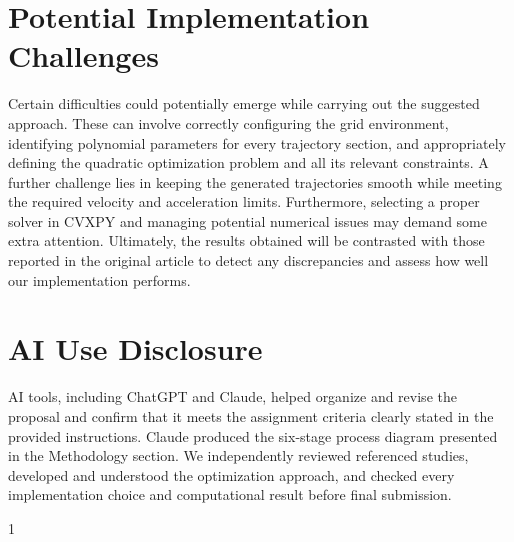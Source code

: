 \documentclass[12pt]{article}
\begin{document}
\section{Potential Implementation Challenges}
Certain difficulties could potentially emerge while carrying out the suggested approach. These can involve correctly configuring the grid environment, identifying polynomial parameters for every trajectory section, and appropriately defining the quadratic optimization problem and all its relevant constraints. A further challenge lies in keeping the generated trajectories smooth while meeting the required velocity and acceleration limits. Furthermore, selecting a proper solver in CVXPY and managing potential numerical issues may demand some extra attention. Ultimately, the results obtained will be contrasted with those reported in the original article to detect any discrepancies and assess how well our implementation performs.

\section{AI Use Disclosure}
AI tools, including ChatGPT and Claude, helped organize and revise the proposal and confirm that it meets the assignment criteria clearly stated in the provided instructions. Claude produced the six-stage process diagram presented in the Methodology section. We independently reviewed referenced studies, developed and understood the optimization approach, and checked every implementation choice and computational result before final submission.

\clearpage %

\begin{spacing}{1}

\end{spacing}
\end{document}
